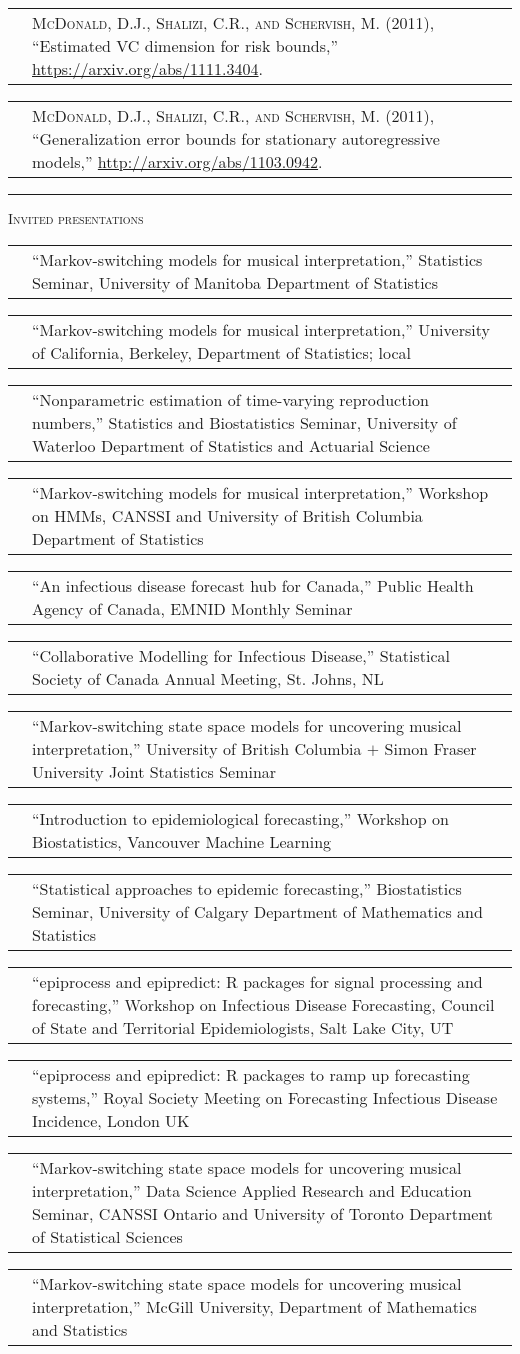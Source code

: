 \documentclass[11pt,letterpaper]{minimal/moderncv}
\makeatletter
\renewcommand{\section}[1]{  \par\addvspace{15pt}%
  \parbox[t]{\hintscolumnwidth}{\strut\raggedleft\raisebox{4pt}%
  {\rule{\hintscolumnwidth}{2pt}}}%
  \hspace{\separatorcolumnwidth}%
  \textsc{\Large #1}\par\nobreak\addvspace{6pt}%
}
\renewcommand*{\cvitem}[2]{%
  \begin{tabular}{@{}p{\hintscolumnwidth}@{\hspace{\separatorcolumnwidth}}%
    p{\maincolumnwidth}@{}}%
    \raggedleft {#1} &  {#2}%
  \end{tabular}%
}
\makeatother
\begin{document}
\cvitem{}{{\scshape McDonald, D.J., Shalizi, C.R., and Schervish, M.} (2011),
``Estimated VC dimension for risk bounds,''
\url{https://arxiv.org/abs/1111.3404}.\vspace*{6pt}}

\cvitem{}{{\scshape McDonald, D.J., Shalizi, C.R., and Schervish, M.} (2011),
``Generalization error bounds for stationary autoregressive models,''
\url{http://arxiv.org/abs/1103.0942}.}


    

\section{Invited presentations}

\cvitem{2025}{``Markov-switching models for musical interpretation,'' Statistics Seminar, University of Manitoba Department of Statistics}
\cvitem{}{``Markov-switching models for musical interpretation,'' University of California, Berkeley, Department of Statistics; local}
\cvitem{}{``Nonparametric estimation of time-varying reproduction numbers,'' Statistics and Biostatistics Seminar, University of Waterloo Department of Statistics and Actuarial Science}
\cvitem{}{``Markov-switching models for musical interpretation,'' Workshop on HMMs, CANSSI and University of British Columbia Department of Statistics
}

\cvitem{2024}{``An infectious disease forecast hub for Canada,'' Public Health 
  Agency of Canada, EMNID Monthly Seminar}
\cvitem{}{``Collaborative Modelling for Infectious Disease,'' Statistical Society of Canada Annual Meeting, St. Johns, NL}
\cvitem{}{``Markov-switching state space models for uncovering musical 
  interpretation,'' University of British Columbia $+$ Simon Fraser University
  Joint Statistics Seminar}
\cvitem{}{``Introduction to epidemiological forecasting,'' Workshop on Biostatistics,
  Vancouver Machine Learning}

\cvitem{2023}{``Statistical approaches to epidemic forecasting,'' Biostatistics 
  Seminar, University of Calgary Department of Mathematics and Statistics}
\cvitem{}{``epiprocess and epipredict: R packages for signal processing and forecasting,'' Workshop on Infectious Disease Forecasting, Council of State and Territorial Epidemiologists, Salt Lake City, UT}
\cvitem{}{``epiprocess and epipredict: R packages to ramp up forecasting systems,'' Royal Society Meeting on Forecasting Infectious Disease Incidence, London UK}

\cvitem{2022}{``Markov-switching state space models for uncovering musical
  interpretation,'' Data Science Applied Research and Education Seminar, CANSSI
  Ontario and University of Toronto Department of Statistical Sciences}
\cvitem{}{``Markov-switching state space models for uncovering musical
  interpretation,'' McGill University, Department of Mathematics and Statistics}
\end{document}
